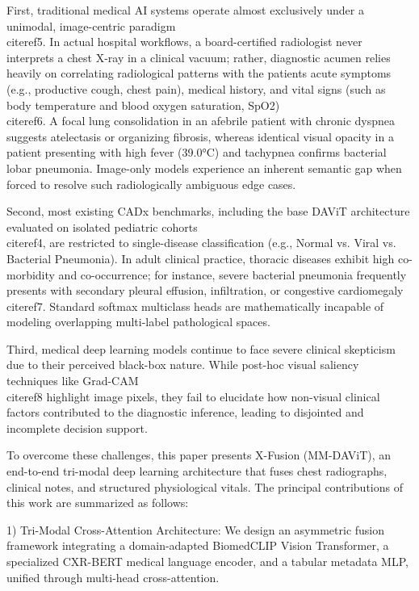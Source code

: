\documentclass[
]{article}
\begin{document}
First, traditional medical AI systems operate almost exclusively under a
unimodal, image-centric paradigm \\cite{ref5}. In actual hospital workflows,
a board-certified radiologist never interprets a chest X-ray in a
clinical vacuum; rather, diagnostic acumen relies heavily on correlating
radiological patterns with the patient\textquotesingle s acute symptoms
(e.g., productive cough, chest pain), medical history, and vital signs
(such as body temperature and blood oxygen saturation, SpO2) \\cite{ref6}. A
focal lung consolidation in an afebrile patient with chronic dyspnea
suggests atelectasis or organizing fibrosis, whereas identical visual
opacity in a patient presenting with high fever (39.0°C) and tachypnea
confirms bacterial lobar pneumonia. Image-only models experience an
inherent semantic gap when forced to resolve such radiologically
ambiguous edge cases.

Second, most existing CADx benchmarks, including the base DAViT
architecture evaluated on isolated pediatric cohorts \\cite{ref4}, are
restricted to single-disease classification (e.g., Normal vs. Viral vs.
Bacterial Pneumonia). In adult clinical practice, thoracic diseases
exhibit high co-morbidity and co-occurrence; for instance, severe
bacterial pneumonia frequently presents with secondary pleural effusion,
infiltration, or congestive cardiomegaly \\cite{ref7}. Standard softmax
multiclass heads are mathematically incapable of modeling overlapping
multi-label pathological spaces.

Third, medical deep learning models continue to face severe clinical
skepticism due to their perceived
\textquotesingle black-box\textquotesingle{} nature. While post-hoc
visual saliency techniques like Grad-CAM \\cite{ref8} highlight image pixels,
they fail to elucidate how non-visual clinical factors contributed to
the diagnostic inference, leading to disjointed and incomplete decision
support.

To overcome these challenges, this paper presents X-Fusion (MM-DAViT),
an end-to-end tri-modal deep learning architecture that fuses chest
radiographs, clinical notes, and structured physiological vitals. The
principal contributions of this work are summarized as follows:

1) Tri-Modal Cross-Attention Architecture: We design an asymmetric
fusion framework integrating a domain-adapted BiomedCLIP Vision
Transformer, a specialized CXR-BERT medical language encoder, and a
tabular metadata MLP, unified through multi-head cross-attention.
\end{document}
